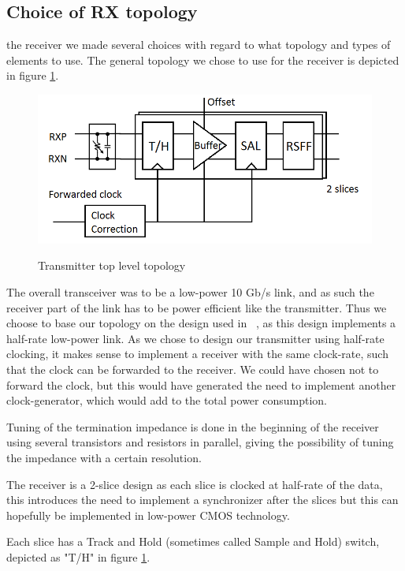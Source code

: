 \subsection{Choice of RX topology}

 the receiver we made several choices with regard to what topology and types of elements to use. The general topology we chose to use for the receiver is depicted in figure \ref{fig:topology}.

\begin{figure}[H]
  \centering
  {\includegraphics[scale=0.55]{img/topology_rx.png}}
  \caption{Transmitter top level topology}
  \label{fig:topology}
\end{figure}


The overall transceiver was to be a low-power 10 Gb/s link, and as such the receiver part of the link has to be power efficient like the transmitter. Thus we choose to base our topology on the design used in ~\cite{mahony2010a}, as this design implements a half-rate low-power link. As we chose to design our transmitter using half-rate clocking, it makes sense to implement a receiver with the same clock-rate, such that the clock can be forwarded to the receiver. We could have chosen not to forward the clock, but this would have generated the need to implement another clock-generator, which would add to the total power consumption.


Tuning of the termination impedance is done in the beginning of the receiver using several transistors and resistors in parallel, giving the possibility of tuning the impedance with a certain resolution.

The receiver is a 2-slice design as each slice is clocked at half-rate of the data, this introduces the need to implement a synchronizer after the slices but this can hopefully be implemented in low-power CMOS technology.

Each slice has a Track and Hold (sometimes called Sample and Hold) switch, depicted as "T/H" in figure \ref{fig:topology}.

